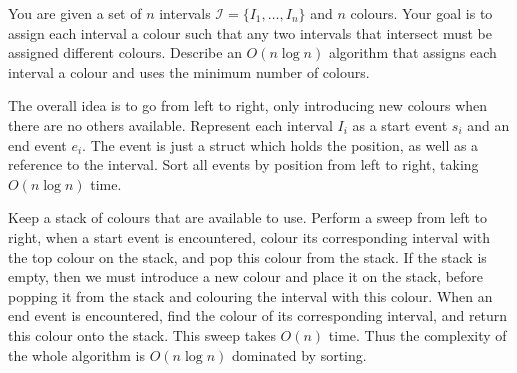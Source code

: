 \documentclass{article}
\begin{document}
\begin{question}
You are given a set of $n$ intervals $\mathcal I = \{I_1, \dots, I_n\}$ and $n$ colours. Your goal is to assign each interval a colour such that any two intervals that intersect must be assigned different colours. Describe an $O(n \log n)$ algorithm that assigns each interval a colour and uses the minimum number of colours.
\end{question}

\begin{solution}
    The overall idea is to go from left to right, only introducing new colours when 
    there are no others available.
    Represent each interval $I_i$ as a start event $s_i$ and an end event $e_i$.
    The event is just a struct which holds the position, as well as a reference to the interval.
    Sort all events by position from left to right, taking $O(n\log n)$ time.

    Keep a stack of colours that are available to use.
    Perform a sweep from left to right,
    when a start event is encountered, colour its corresponding interval with 
    the top colour on the stack, and pop this colour from the stack.
    If the stack is empty, then we must introduce a new colour and place it on the stack, 
    before popping it from the stack and colouring the interval with this colour.
    When an end event is encountered, find the colour of its corresponding interval, 
    and return this colour onto the stack.
    This sweep takes $O(n)$ time. Thus the complexity of the whole algorithm is $O(n\log n)$ dominated by sorting.

\end{solution}
\end{document}
